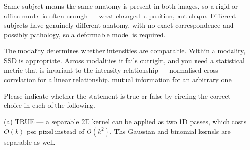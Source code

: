 \documentclass[11pt]{exam}
\newcommand{\TFT}{\ifprintanswers\textbf{TRUE}\hspace{1.1em}False\else True\hspace{1.1em}False\fi}
\newcommand{\TFF}{True\hspace{1.1em}\ifprintanswers\textbf{FALSE}\else False\fi}
\newcommand{\answerspace}[1]{\ifprintanswers\else\vspace{#1}\fi}
\begin{document}
\begin{questions}
\begin{parts}
\begin{solution}
    Same subject means the same anatomy is present in both images, so a rigid or affine model is
    often enough --- what changed is position, not shape. Different subjects have genuinely
    different anatomy, with no exact correspondence and possibly pathology, so a deformable model
    is required.

    The modality determines whether intensities are comparable. Within a modality, SSD is
    appropriate. Across modalities it fails outright, and you need a statistical metric that is
    invariant to the intensity relationship --- normalised cross-correlation for a linear
    relationship, mutual information for an arbitrary one.
  \end{solution}
\answerspace{3.6cm}
\end{parts}

\question
Please indicate whether the statement is true or false by circling the correct choice in each of
the following.


\begin{solution}
  (a) TRUE --- a separable 2D kernel can be applied as two 1D passes, which costs $O(k)$ per pixel
  instead of $O(k^2)$. The Gaussian and binomial kernels are separable as well.


\end{solution}
\end{questions}
\end{document}
